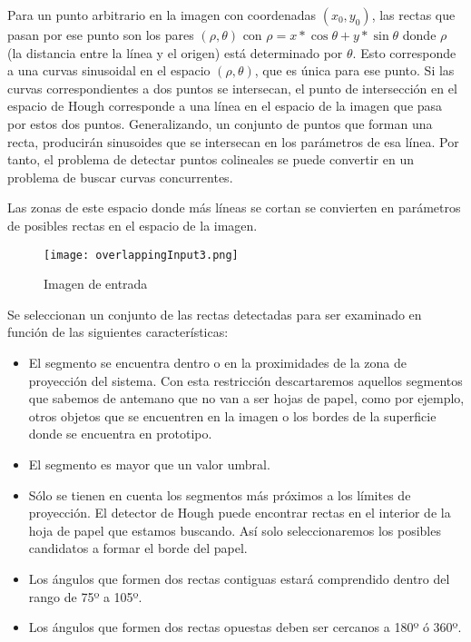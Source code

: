 Para un punto arbitrario en la imagen con coordenadas $(x_0,y_0)$, las rectas que pasan por ese punto son los pares  $(\rho,\theta)$ con  $\rho=x*\cos \theta + y * \sin \theta$ donde $\rho$ (la distancia entre la línea y el origen) está determinado por $\theta$. Esto corresponde a una curvas sinusoidal en el espacio  $(\rho,\theta)$, que es única para ese punto. Si las curvas correspondientes  a dos puntos se intersecan, el punto de intersección en el espacio de Hough corresponde  a una línea en el espacio de la imagen que pasa por estos dos puntos. Generalizando, un conjunto de puntos que forman una recta, producirán sinusoides que se intersecan en los parámetros de esa línea. Por tanto, el problema de detectar puntos colineales se puede convertir en un problema
de buscar curvas concurrentes.

Las zonas de este espacio donde más líneas se cortan se convierten en parámetros de posibles rectas en el espacio de la imagen.

 \begin{figure}[h!] 
    \centering
    \texttt{[image: overlappingInput3.png]}
    \caption{Imagen de entrada}
    \label{fig:overlapping}
  \end{figure}

Se seleccionan un conjunto de las rectas detectadas para ser examinado en función de las siguientes características:

\begin{itemize}
\item El segmento se encuentra dentro o en la proximidades de la zona de proyección del
  sistema. Con esta restricción descartaremos aquellos segmentos que sabemos de antemano que no van
  a ser hojas de papel, como por ejemplo, otros objetos que se encuentren en la imagen o los bordes
  de la superficie donde se encuentra en prototipo.
  
\item El segmento es mayor que un valor umbral.
\item Sólo se tienen en cuenta los segmentos más próximos a los límites de proyección. El detector
  de Hough puede encontrar rectas en el interior de la hoja de papel que estamos buscando. Así solo
  seleccionaremos los posibles candidatos a formar el borde del papel.
 \item Los ángulos que formen dos rectas contiguas estará comprendido dentro del rango de 75º a 105º.
\item Los ángulos que formen dos rectas opuestas deben ser cercanos a 180º ó 360º.
\end{itemize}

